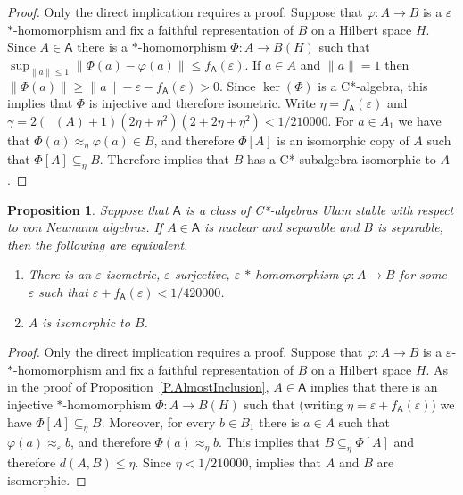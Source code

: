 \documentclass[11pt]{amsproc}
\DeclareMathOperator{\dimnuc}{dim_{nuc}}
\newcommand{\cstar}{C*}
\newcommand{\sfA}{\mathsf A}
\theoremstyle{definition}
\theoremstyle{plain}
\newtheorem{proposition}[definition]{Proposition}
\theoremstyle{remark}
\begin{document}
\begin{proof} Only the direct implication requires a proof. Suppose that $\varphi\colon A\to B$ is a $\varepsilon$$*$-homomorphism and fix a faithful representation of $B$ on a Hilbert space $H$. 
	Since $A\in \sfA$ there is a $*$-homomorphism $\Phi\colon A\to B(H)$ such that $\sup_{\|a\|\leq 1} \|\Phi(a)-\varphi(a)\|\leq f_\sfA(\varepsilon)$. 
	If $a\in A$ and $\|a\|=1$ then $\|\Phi(a)\|\geq \|a\|-\varepsilon-f_\sfA(\varepsilon)>0$. Since $\ker(\Phi)$ is a \cstar-algebra, this implies that $\Phi$ is injective and therefore isometric.   Write $\eta=f_\sfA(\varepsilon)$ and $\gamma=2(\dimnuc(A)+1)(2\eta+\eta^2)(2+2\eta+\eta^2)<1/210000$. 
	For $a\in A_1$ we have that $\Phi(a)\approx_{\eta} \varphi(a)\in B$, and therefore $\Phi[A]$ is an isomorphic copy of $A$ such that $\Phi[A]\subseteq_\eta B$.  Therefore \cite[Theorem~6.10]{CSSWW:Perturbations} implies that $B$ has a \cstar-subalgebra isomorphic to $A$.
\end{proof}



\begin{proposition}
	\label{P.AlmostIsomorphic}
	Suppose that $\sfA$ is a class of \cstar-algebras Ulam stable with respect to von Neumann algebras. If $A\in \sfA$ is nuclear and separable and $B$ is separable, then the following are equivalent. 
	\begin{enumerate}
		\item There is an $\varepsilon$-isometric, $\varepsilon$-surjective,  $\varepsilon$-$*$-homomorphism $\varphi\colon A\to B$ for some $\varepsilon$ such that  $\varepsilon+f_\sfA(\varepsilon)<1/420000$. 		\item $A$ is isomorphic to $B$. 
	\end{enumerate}
\end{proposition}

\begin{proof}
	Only the direct implication requires a proof.   Suppose that $\varphi\colon A\to B$ is a $\varepsilon$-$*$-homomorphism and fix a faithful representation of $B$ on a Hilbert space $H$. 
	As in the proof of Proposition~\ref{P.AlmostInclusion}, $A\in \sfA$ implies that there is an injective  $*$-homomorphism $\Phi\colon A\to B(H)$ such that (writing $\eta=\varepsilon+f_\sfA(\varepsilon)$) we have  $\Phi[A]\subseteq_{\eta} B$. 
	Moreover, for every $b\in B_1$ there is $a\in A$ such that $\varphi(a)\approx_\varepsilon b$, 
	and therefore $\Phi(a)\approx_{\eta} b$. This implies that $B\subseteq_\eta \Phi[A]$ and therefore $d(A,B)\leq \eta$. Since $\eta<1/210000$, 
	\cite[Theorem~4.3]{CSSWW:Perturbations} implies that  $A$ and $B$ are isomorphic. 
\end{proof}
\end{document}
